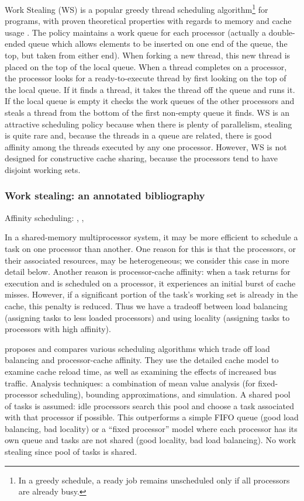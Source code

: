 Work Stealing (WS) is a popular greedy thread scheduling
algorithm\footnote{In a greedy schedule, a ready job remains
  unscheduled only if all processors are already busy.} for programs,
with proven theoretical properties with regards to memory and cache
usage \cite{Blumofe1998a, Blumofe1999, Acar2002}. The policy maintains
a work queue for each processor (actually a double-ended queue which
allows elements to be inserted on one end of the queue, the top, but
taken from either end). When forking a new thread, this new thread is
placed on the top of the local queue. When a thread completes on a
processor, the processor looks for a ready-to-execute thread by first
looking on the top of the local queue. If it finds a thread, it takes
the thread off the queue and runs it. If the local queue is empty it
checks the work queues of the other processors and steals a thread
from the bottom of the first non-empty queue it finds. WS is an
attractive scheduling policy because when there is plenty of
parallelism, stealing is quite rare and, because the threads in a
queue are related, there is good affinity among the threads executed
by any one processor. However, WS is not designed for constructive
cache sharing, because the processors tend to have disjoint working
sets.

\subsubsection{Work stealing: an annotated bibliography
  \cite{Neill2001}}

Affinity scheduling: \cite{Squillante1993}, \cite{Squillante2001},
\cite{Acar2002}

In a shared-memory multiprocessor system, it may be more efficient to
schedule a task on one processor than another. One reason for this is
that the processors, or their associated resources, may be
heterogeneous; we consider this case in more detail below. Another
reason is processor-cache affinity: when a task returns for execution
and is scheduled on a processor, it experiences an initial burst of
cache misses. However, if a significant portion of the task's working
set is already in the cache, this penalty is reduced. Thus we have a
tradeoff between load balancing (assigning tasks to less loaded
processors) and using locality (assigning tasks to processors with
high affinity).

\cite{Squillante1993} proposes and compares various scheduling
algorithms which trade off load balancing and processor-cache
affinity. They use the detailed cache model to examine cache reload
time, as well as examining the effects of increased bus
traffic. Analysis techniques: a combination of mean value analysis
(for fixed-processor scheduling), bounding approximations, and
simulation. A shared pool of tasks is assumed: idle processors search
this pool and choose a task associated with that processor if
possible. This outperforms a simple FIFO queue (good load balancing,
bad locality) or a ``fixed processor'' model where each processor has
its own queue and tasks are not shared (good locality, bad load
balancing). No work stealing since pool of tasks is shared.

